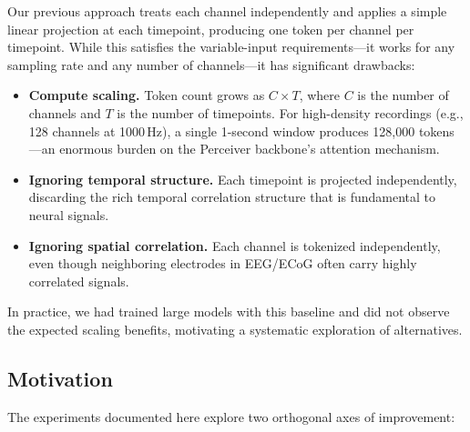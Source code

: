 \documentclass[11pt, a4paper]{article}
\begin{document}
Our previous approach treats each channel independently and applies a
simple linear projection at each timepoint, producing one token per
channel per timepoint. While this satisfies the variable-input
requirements---it works for any sampling rate and any number of
channels---it has significant drawbacks:

\begin{itemize}[nosep]
      \item \textbf{Compute scaling.} Token count grows as
            $C \times T$, where $C$ is the number of channels and
            $T$ is the number of timepoints. For high-density recordings
            (e.g., 128 channels at 1000\,Hz), a single 1-second window
            produces 128{,}000 tokens---an enormous burden on the Perceiver
            backbone's attention mechanism.
      \item \textbf{Ignoring temporal structure.} Each timepoint is projected
            independently, discarding the rich temporal correlation structure
            that is fundamental to neural signals.
      \item \textbf{Ignoring spatial correlation.} Each channel is tokenized
            independently, even though neighboring electrodes in EEG/ECoG
            often carry highly correlated signals.
\end{itemize}

In practice, we had trained large models with this baseline and did not
observe the expected scaling benefits, motivating a systematic exploration
of alternatives.

\subsection{Motivation}

The experiments documented here explore two orthogonal axes of improvement:
\end{document}
